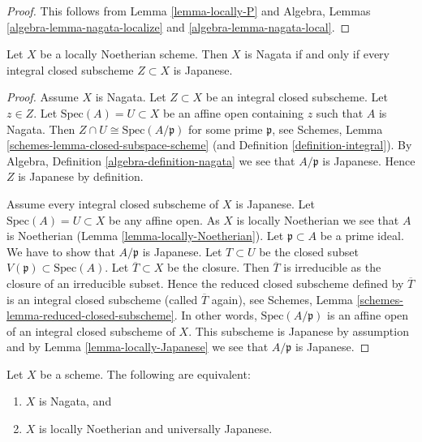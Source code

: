 \begin{proof}
This follows from Lemma \ref{lemma-locally-P} and
Algebra, Lemmas \ref{algebra-lemma-nagata-localize} and
\ref{algebra-lemma-nagata-local}.
\end{proof}

\begin{lemma}
\label{lemma-characterize-nagata}
Let $X$ be a locally Noetherian scheme.
Then $X$ is Nagata if and only if every integral closed subscheme
$Z \subset X$ is Japanese.
\end{lemma}

\begin{proof}
Assume $X$ is Nagata. Let $Z \subset X$ be an integral closed subscheme.
Let $z \in Z$.
Let $\text{Spec}(A) = U \subset X$ be an affine open containing $z$
such that $A$ is Nagata. Then
$Z \cap U \cong \text{Spec}(A/\mathfrak p)$ for some prime $\mathfrak p$,
see Schemes, Lemma \ref{schemes-lemma-closed-subspace-scheme} (and
Definition \ref{definition-integral}). By
Algebra, Definition \ref{algebra-definition-nagata} we see
that $A/\mathfrak p$ is Japanese. Hence $Z$ is Japanese by definition.

\medskip\noindent
Assume every integral closed subscheme of $X$ is Japanese.
Let $\text{Spec}(A) = U \subset X$ be any affine open.
As $X$ is locally Noetherian we see that $A$ is Noetherian
(Lemma \ref{lemma-locally-Noetherian}). Let $\mathfrak p \subset A$
be a prime ideal. We have to show that $A/\mathfrak p$ is Japanese.
Let $T \subset U$ be the closed subset $V(\mathfrak p) \subset \text{Spec}(A)$.
Let $\overline{T} \subset X$ be the closure. Then $\overline{T}$ is
irreducible as the closure of an irreducible subset. Hence the reduced
closed subscheme defined by $\overline{T}$ is an integral closed
subscheme (called $\overline{T}$ again), see
Schemes, Lemma \ref{schemes-lemma-reduced-closed-subscheme}.
In other words, $\text{Spec}(A/\mathfrak p)$ is an affine
open of an integral closed subscheme of $X$. This subscheme is Japanese
by assumption and by Lemma \ref{lemma-locally-Japanese} we see that
$A/\mathfrak p$ is Japanese.
\end{proof}

\begin{lemma}
\label{lemma-nagata-universally-Japanese}
Let $X$ be a scheme.
The following are equivalent:
\begin{enumerate}
\item $X$ is Nagata, and
\item $X$ is locally Noetherian and universally Japanese.
\end{enumerate}
\end{lemma}


